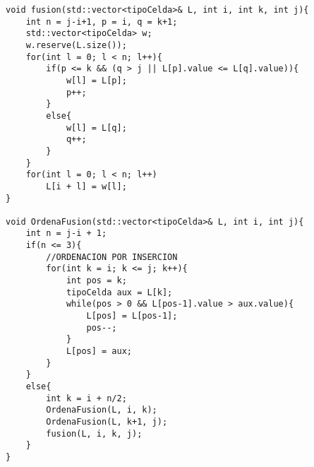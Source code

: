 \begin{lstlisting}
void fusion(std::vector<tipoCelda>& L, int i, int k, int j){
    int n = j-i+1, p = i, q = k+1;
    std::vector<tipoCelda> w;
    w.reserve(L.size());
    for(int l = 0; l < n; l++){
        if(p <= k && (q > j || L[p].value <= L[q].value)){
            w[l] = L[p];
            p++;
        }
        else{
            w[l] = L[q];
            q++;
        }
    }
    for(int l = 0; l < n; l++)
        L[i + l] = w[l];
}

void OrdenaFusion(std::vector<tipoCelda>& L, int i, int j){
    int n = j-i + 1;
    if(n <= 3){
        //ORDENACION POR INSERCION
        for(int k = i; k <= j; k++){
            int pos = k;
            tipoCelda aux = L[k];
            while(pos > 0 && L[pos-1].value > aux.value){
                L[pos] = L[pos-1];
                pos--;
            }
            L[pos] = aux;
        }
    }
    else{
        int k = i + n/2;
        OrdenaFusion(L, i, k);
        OrdenaFusion(L, k+1, j);
        fusion(L, i, k, j);
    }
}
\end{lstlisting}
